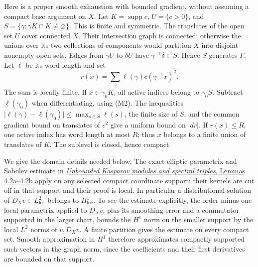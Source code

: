 \documentclass[
  11pt,
]{article}
\begin{document}
Here is a proper smooth exhaustion with bounded gradient, without
assuming a compact base argument on \(X\). Let
\(K=\operatorname{supp}c\), \(U=\{c>0\}\), and
\(S=\{\gamma:\gamma K\cap K\ne\varnothing\}\). This is finite and
symmetric. The translates of the open set \(U\) cover connected \(X\).
Their intersection graph is connected; otherwise the unions over its two
collections of components would partition \(X\) into disjoint nonempty
open sets. Edges from \(\gamma U\) to \(\delta U\) have
\(\gamma^{-1}\delta\in S\). Hence \(S\) generates \(\Gamma\). Let
\(\ell\) be its word length and set \[
r(x)=\sum_\gamma \ell(\gamma)c(\gamma^{-1}x)^2.
\tag{M3}
\] The sum is locally finite. If \(x\in\gamma_0K\), all active indices
belong to \(\gamma_0S\). Subtract \(\ell(\gamma_0)\) when
differentiating, using (M2). The inequalities
\(\lvert\ell(\gamma)-\ell(\gamma_0)\rvert\leq\max_{s\in S}\ell(s)\), the
finite size of \(S\), and the common gradient bound on translates of
\(c^2\) give a uniform bound on \(\lvert dr\rvert\). If \(r(x)\leq R\),
one active index has word length at most \(R\); thus \(x\) belongs to a
finite union of translates of \(K\). The sublevel is closed, hence
compact.

We give the domain details needed below. The exact elliptic parametrix
and Sobolev estimate in
\href{KT-KK-11.html\#4-spectral-triples-and-the-circle}{\emph{Unbounded
Kasparov modules and spectral triples}, Lemmas 4.2a--4.2b} apply on any
selected compact coordinate support: their kernels are cut off in that
support and their proof is local. In particular a distributional
solution of \(D_Xv\in L^2_{\mathrm{loc}}\) belongs to
\(H^1_{\mathrm{loc}}\). To see the estimate explicitly, the
order-minus-one local parametrix applied to \(D_Xv\), plus its smoothing
error and a commutator supported in the larger chart, bounds the \(H^1\)
norm on the smaller support by the local \(L^2\) norms of \(v,D_Xv\). A
finite partition gives the estimate on every compact set. Smooth
approximation in \(H^1\) therefore approximates compactly supported such
vectors in the graph norm, since the coefficients and their first
derivatives are bounded on that support.
\end{document}
